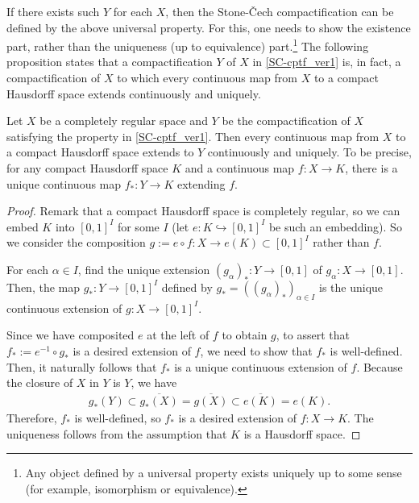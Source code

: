 If there exists such $Y$ for each $X$, then the Stone-\v{C}ech compactification can be defined by the above universal property.
For this, one needs to show the existence part, rather than the uniqueness (up to equivalence) part.\footnote{Any object defined by a universal property exists uniquely up to some sense (for example, isomorphism or equivalence).}
The following proposition states that a compactification $Y$ of $X$ in \cref{SC-cptf_ver1} is, in fact, a compactification of $X$ to which every continuous map from $X$ to a compact Hausdorff space extends continuously and uniquely.
\begin{prop}
    Let $X$ be a completely regular space and $Y$ be the compactification of $X$ satisfying the property in \cref{SC-cptf_ver1}.
    Then every continuous map from $X$ to a compact Hausdorff space extends to $Y$ continuously and uniquely.
    To be precise, for any compact Hausdorff space $K$ and a continuous map $f: X\rightarrow K$, there is a unique continuous map $f_*: Y\rightarrow K$ extending $f$.
\end{prop}
\begin{proof}
    Remark that a compact Hausdorff space is completely regular, so we can embed $K$ into $[0, 1]^I$ for some $I$ (let $e: K\hookrightarrow[0, 1]^I$ be such an embedding).
    So we consider the composition $g:=e\circ f: X\rightarrow e(K)\subset[0, 1]^I$ rather than $f$.
    
    For each $\alpha\in I$, find the unique extension $(g_\alpha)_*: Y\rightarrow[0, 1]$ of $g_\alpha: X\rightarrow[0, 1]$.
    Then, the map $g_*: Y\rightarrow[0, 1]^I$ defined by $g_*=((g_\alpha)_*)_{\alpha\in I}$ is the unique continuous extension of $g: X\rightarrow[0, 1]^I$.
    
    Since we have composited $e$ at the left of $f$ to obtain $g$, to assert that $f_*:=e^{-1}\circ g_*$ is a desired extension of $f$, we need to show that $f_*$ is well-defined.
    Then, it naturally follows that $f_*$ is a unique continuous extension of $f$.
    Because the closure of $X$ in $Y$ is $Y$, we have
    \begin{align*}
        g_*(Y)\subset\overline{g_*(X)}=\overline{g(X)}\subset\overline{e(K)}=e(K).
    \end{align*}
    Therefore, $f_*$ is well-defined, so $f_*$ is a desired extension of $f: X\rightarrow K$.
    The uniqueness follows from the assumption that $K$ is a Hausdorff space.
\end{proof}

